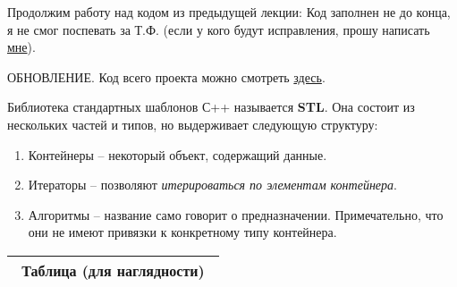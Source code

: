 \begin{lecture}[\lectureSubject]
	\begin{lecSection}[LinkedList]
		Продолжим работу над кодом из предыдущей лекции:
		Код заполнен не до конца, я не смог поспевать за Т.Ф. (если у кого будут исправления, прошу написать \href{https://vk.com/alekseik1}{мне}).
		\begin{center}
			{\large{ОБНОВЛЕНИЕ. Код всего проекта можно смотреть \href{https://github.com/alekseik1/cpp\_lections\_2017/tree/master/lection\%207}{здесь}.
			}}
		\end{center}
	\end{lecSection}
	\begin{lecSection}
		Библиотека стандартных шаблонов С++ называется \textbf{STL}.
		Она состоит из нескольких частей и типов, но выдерживает следующую структуру:
		\begin{enumerate}
			\item Контейнеры -- некоторый объект, содержащий данные.
			\item Итераторы -- позволяют \textit{итерироваться по элементам контейнера}.
			\item Алгоритмы -- название само говорит о предназначении. Примечательно, что они не имеют привязки к конкретному типу контейнера.
		\end{enumerate}
		\begin{tabular}{|p{0.31\linewidth}|p{0.31\linewidth}|p{0.31\linewidth}|}
			\multicolumn{3}{c}{\bfseries Таблица (для наглядности)} \\ \hline
			

\end{tabular}
\end{lecSection}
\end{lecture}

